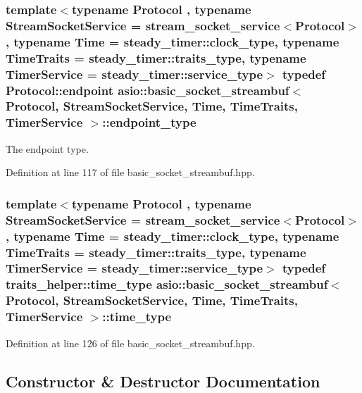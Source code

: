 \subsubsection[{endpoint\+\_\+type}]{\setlength{\rightskip}{0pt plus 5cm}template$<$typename Protocol , typename Stream\+Socket\+Service  = stream\+\_\+socket\+\_\+service$<$\+Protocol$>$, typename Time  = steady\+\_\+timer\+::clock\+\_\+type, typename Time\+Traits  = steady\+\_\+timer\+::traits\+\_\+type, typename Timer\+Service  = steady\+\_\+timer\+::service\+\_\+type$>$ typedef Protocol\+::endpoint {\bf asio\+::basic\+\_\+socket\+\_\+streambuf}$<$ Protocol, Stream\+Socket\+Service, Time, Time\+Traits, Timer\+Service $>$\+::{\bf endpoint\+\_\+type}}\label{classasio_1_1basic__socket__streambuf_a89b46b0c3c210f854b355799821fd5db}


The endpoint type. 



Definition at line 117 of file basic\+\_\+socket\+\_\+streambuf.\+hpp.

\hypertarget{classasio_1_1basic__socket__streambuf_ac26395546c2d9decf0bcbc40b8f78adc}{}
\subsubsection[{time\+\_\+type}]{\setlength{\rightskip}{0pt plus 5cm}template$<$typename Protocol , typename Stream\+Socket\+Service  = stream\+\_\+socket\+\_\+service$<$\+Protocol$>$, typename Time  = steady\+\_\+timer\+::clock\+\_\+type, typename Time\+Traits  = steady\+\_\+timer\+::traits\+\_\+type, typename Timer\+Service  = steady\+\_\+timer\+::service\+\_\+type$>$ typedef {\bf traits\+\_\+helper\+::time\+\_\+type} {\bf asio\+::basic\+\_\+socket\+\_\+streambuf}$<$ Protocol, Stream\+Socket\+Service, Time, Time\+Traits, Timer\+Service $>$\+::{\bf time\+\_\+type}}\label{classasio_1_1basic__socket__streambuf_ac26395546c2d9decf0bcbc40b8f78adc}


Definition at line 126 of file basic\+\_\+socket\+\_\+streambuf.\+hpp.



\subsection{Constructor \& Destructor Documentation}
\hypertarget{classasio_1_1basic__socket__streambuf_a8b6bcf4f53efd55ce5d89cefcdc85673}{}
